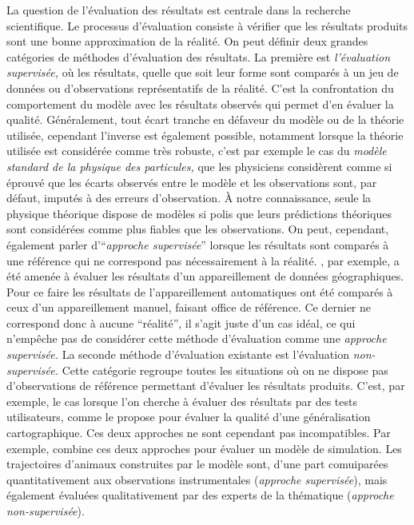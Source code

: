 La question de l’évaluation des résultats est centrale dans la
recherche scientifique. Le processus d'évaluation consiste à vérifier
que les résultats produits sont une bonne approximation de la
réalité. On peut définir deux grandes catégories de méthodes
d'évaluation des résultats. La première est \emph{l'évaluation
  supervisée,} où les résultats, quelle que soit leur forme sont
comparés à un jeu de données ou d'observations représentatifs de la
réalité. C'est la confrontation du comportement du modèle avec les
résultats observés qui permet d'en évaluer la qualité. Généralement,
tout écart tranche en défaveur du modèle ou de la théorie utilisée,
cependant l'inverse est également possible, notamment lorsque la
théorie utilisée est considérée comme très robuste, c'est par exemple
le cas du \emph{modèle standard de la physique des particules,} que
les physiciens considèrent comme si éprouvé que les écarts observés
entre le modèle et les observations sont, par défaut, imputés à des
erreurs d'observation. À notre connaissance, seule la physique
théorique dispose de modèles si polis que leurs prédictions théoriques
sont considérées comme plus fiables que les observations. On peut,
cependant, également parler d'\enquote{\emph{approche supervisée}}
lorsque les résultats sont comparés à une référence qui ne correspond
pas nécessairement à la réalité. \textcite{OletanuRaimond2008}, par
exemple, a été amenée à évaluer les résultats d'un appareillement de
données géographiques. Pour ce faire les résultats de l'appareillement
automatiques ont été comparés à ceux d'un appareillement manuel,
faisant office de référence. Ce dernier ne correspond donc à aucune
\enquote{réalité}, il s'agit juste d'un cas idéal, ce qui n’empêche
pas de considérer cette méthode d’évaluation comme une \emph{approche
  supervisée.} La seconde méthode d'évaluation existante est
l'évaluation \emph{non-supervisée.}  Cette catégorie regroupe toutes
les situations où on ne dispose pas d'observations de référence
permettant d'évaluer les résultats produits. C'est, par exemple, le
cas lorsque l'on cherche à évaluer des résultats par des tests
utilisateurs, comme le propose \textcite{Dumont2018} pour évaluer la
qualité d'une généralisation cartographique. Ces deux approches ne
sont cependant pas incompatibles. Par exemple, \textcite{Jolivet2014}
combine ces deux approches pour évaluer un modèle de simulation. Les
trajectoires d’animaux construites par le modèle sont, d'une part
comuiparées quantitativement aux observations instrumentales
(\emph{approche supervisée}), mais également évaluées qualitativement
par des experts de la thématique (\emph{approche non-supervisée}).

